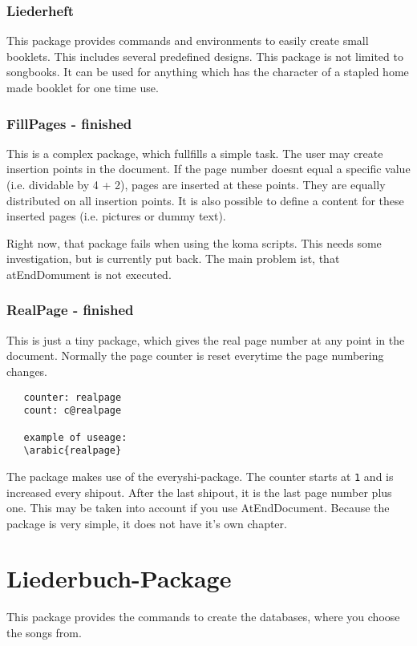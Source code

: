 \documentclass[12pt,a4paper]{scrreprt}
\begin{document}
\subsection{Liederheft} This package provides commands and environments to easily create small booklets. This includes several predefined designs. This package is not limited to songbooks. It can be used for anything which has the character of a stapled home made booklet for one time use.

\subsection{FillPages - finished}
This is a complex package, which fullfills a simple task. The user may create insertion points in the document. If the page number doesnt equal a specific value (i.e. dividable by 4 + 2), pages are inserted at these points. They are equally distributed on all insertion points. It is also possible to define a content for these inserted pages (i.e. pictures or dummy text).

Right now, that package fails when using the koma scripts. This needs some investigation, but is currently put back. The main problem ist, that atEndDomument is not executed.

\subsection{RealPage - finished}
This is just a tiny package, which gives the real page number at any point in the document. Normally the page counter is reset everytime the page numbering changes.
\begin{verbatim}
   counter: realpage
   count: c@realpage
   
   example of useage:   
   \arabic{realpage}
\end{verbatim}

The package makes use of the everyshi-package. The counter starts at \verb+1+ and is increased every shipout. After the last shipout, it is the last page number plus one. This may be taken into account if you use AtEndDocument. Because the package is very simple, it does not have it's own chapter.

\chapter{Liederbuch-Package}
This package provides the commands to create the databases, where you choose the songs from. 
\end{document}
